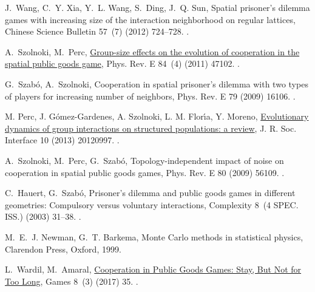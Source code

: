 \documentclass[5p,review]{elsarticle}
\begin{document}
\begin{thebibliography}{10}
J.~Wang, C.~Y. Xia, Y.~L. Wang, S.~Ding, J.~Q. Sun, {Spatial prisoner's dilemma
  games with increasing size of the interaction neighborhood on regular
  lattices}, Chinese Science Bulletin 57~(7) (2012) 724--728.
\newblock \href {http://dx.doi.org/10.1007/s11434-011-4890-4}
  {}.

A.~Szolnoki, M.~Perc,
  \href{http://link.aps.org/doi/10.1103/PhysRevE.84.047102}{{Group-size effects
  on the evolution of cooperation in the spatial public goods game}}, Phys.
  Rev. E 84~(4) (2011) 47102.
\newblock \href {http://dx.doi.org/10.1103/PhysRevE.84.047102}
  {}.

G.~Szab{\'{o}}, A.~Szolnoki, {Cooperation in spatial prisoner's dilemma with
  two types of players for increasing number of neighbors}, Phys. Rev. E 79
  (2009) 16106.
\newblock \href {http://doi.org/10.1103/PhysRevE.79.016106}
  {}.

M. Perc, J. G{\'o}mez-Gardenes, A. Szolnoki, L. M. Flor{\'\i}a, Y. Moreno,
  \href{https://doi.org/10.1098/rsif.2012.0997}{{Evolutionary dynamics of group interactions on structured populations: a review}}, J. R. Soc. Interface 10 (2013) 20120997.
\newblock  \href {https://doi.org/10.1098/rsif.2012.0997}
  {}.
  
A.~Szolnoki, M.~Perc, G.~Szab{\'{o}}, {Topology-independent impact of noise on
  cooperation in spatial public goods games}, Phys. Rev. E 80 (2009) 56109.
\newblock \href {http://dx.doi.org/10.1103/PhysRevE.80.056109}
  {}.

C.~Hauert, G.~Szab{\'{o}}, {Prisoner's dilemma and public goods games in
  different geometries: Compulsory versus voluntary interactions}, Complexity
  8~(4 SPEC. ISS.) (2003) 31--38.
\newblock \href {http://dx.doi.org/10.1002/cplx.10092}
  {}.

M.~E.~J. Newman, G.~T. Barkema, Monte Carlo methods in statistical physics,
  Clarendon Press, Oxford, 1999.

L.~Wardil, M.~Amaral, \href{http://www.mdpi.com/2073-4336/8/3/35}{{Cooperation
  in Public Goods Games: Stay, But Not for Too Long}}, Games 8~(3) (2017) 35.
\newblock \href {http://dx.doi.org/10.3390/g8030035}
  {}.


\end{thebibliography}
\end{document}
